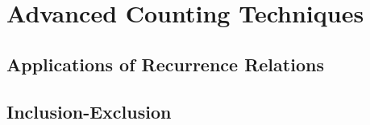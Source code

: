 \documentclass[../discrete.tex]{subfiles}
\begin{document}
\chapter{Advanced Counting Techniques}
\section{Applications of Recurrence Relations}
\section{Inclusion-Exclusion}
\end{document}
